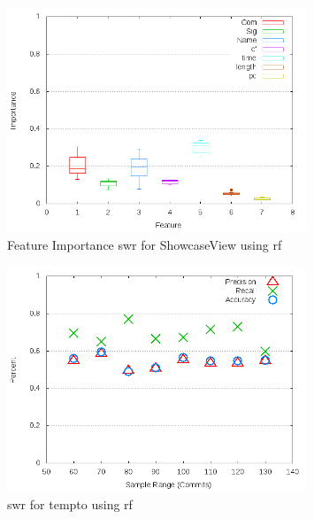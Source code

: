 \begin{figure}[!t]
\centering
\includegraphics[width=0.8\textwidth]{images/rf/test_1/ShowcaseView_importance.png}
\caption{Feature Importance \gls{swr} for ShowcaseView using \gls{rf}}
\label{fig:test_1_ShowcaseView_rf_importance}
\end{figure}

\begin{figure}[!t]
\centering
\includegraphics[width=0.8\textwidth]{images/rf/test_1/tempto_sample_range.png}
\caption{\gls{swr} for tempto using \gls{rf}}
\label{fig:test_1_tempto_rf}
\end{figure}

